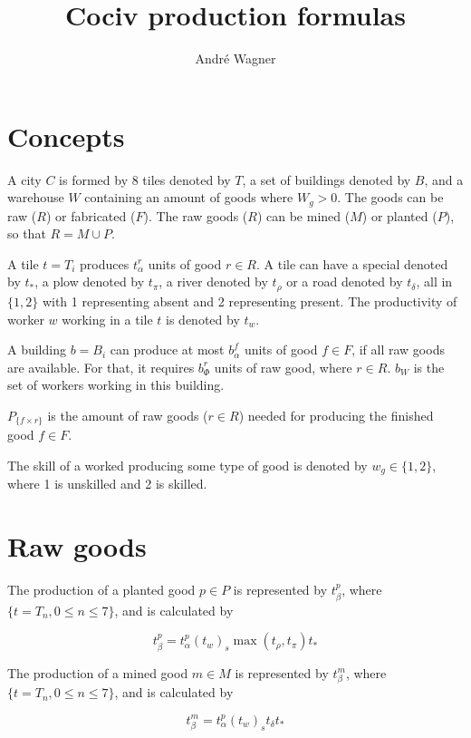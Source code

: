 \documentclass[a4paper,twocolumn]{article}
\author{Andr\'{e} Wagner}
\title{\textbf{Cociv} production formulas}
\date{}
\begin{document}

\section{Concepts}

A city $C$ is formed by 8 tiles denoted by $T$, a set of buildings denoted by $B$, and a warehouse $W$ containing an amount of goods where $W_g > 0$. The goods can be raw ($R$) or fabricated ($F$). The raw goods ($R$) can be mined ($M$) or planted ($P$), so that $R = M \cup P$.

A tile $t = T_i$ produces $t_\alpha^r$ units of good $r \in R$. A tile can have a special denoted by $t_*$, a plow denoted by $t_\pi$, a river denoted by $t_\rho$ or a road denoted by $t_\delta$, all in $\{1,2\}$ with 1 representing absent and 2 representing present. The productivity of worker $w$ working in a tile $t$ is denoted by $t_w$.

A building $b = B_i$ can produce at most $b_\alpha^f$ units of good $f \in F$, if all raw goods are available. For that, it requires $b_\Phi^r$ units of raw good, where $r \in R$. $b_W$ is the set of workers working in this building.

$P_{\{f\times r\}}$ is the amount of raw goods ($r \in R$) needed for producing the finished good $f \in F$.

The skill of a worked producing some type of good is denoted by $w_g \in \{1,2\}$, where 1 is unskilled and 2 is skilled.

\section{Raw goods}

The production of a planted good $p\in P$ is represented by $t_\beta^p$, where $\{t = T_n, 0 \leq n \leq 7\}$, and is calculated by

\begin{equation}
t_\beta^p = t_\alpha^p (t_w)_s \max(t_\rho,t_\pi) t_*
\end{equation}

The production of a mined good $m\in M$ is represented by $t_\beta^m$, where $\{t = T_n, 0 \leq n \leq 7\}$, and is calculated by

\begin{equation}
t_\beta^m = t_\alpha^p (t_w)_s t_\delta t_*
\end{equation}
\end{document}
